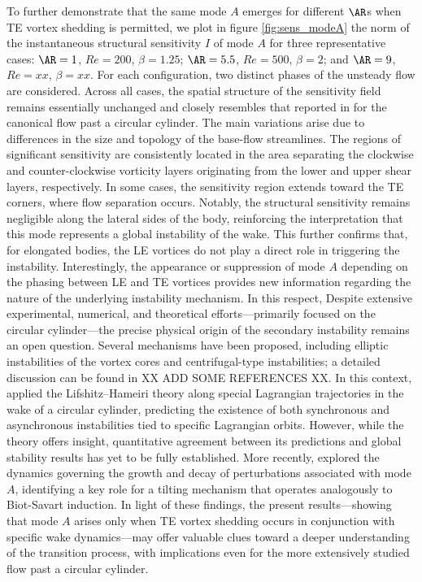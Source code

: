 %
To further demonstrate that the same mode $A$ emerges for different $\AR$s when TE vortex shedding is permitted, we plot in figure \ref{fig:sens_modeA} the norm of the instantaneous structural sensitivity $I$ of mode $A$ for three representative cases: $\AR=1$, $Re=200$, $\beta=1.25$; $\AR=5.5$, $Re=500$, $\beta=2$; and $\AR=9$, $Re=xx$, $\beta=xx$. For each configuration, two distinct phases of the unsteady flow are considered. Across all cases, the spatial structure of the sensitivity field remains essentially unchanged and closely resembles that reported in \cite{} for the canonical flow past a circular cylinder. The main variations arise due to differences in the size and topology of the base-flow streamlines.
%
The regions of significant sensitivity are consistently located in the area separating the clockwise and counter-clockwise vorticity layers originating from the lower and upper shear layers, respectively. In some cases, the sensitivity region extends toward the TE corners, where flow separation occurs. Notably, the structural sensitivity remains negligible along the lateral sides of the body, reinforcing the interpretation that this mode represents a global instability of the wake. This further confirms that, for elongated bodies, the LE vortices do not play a direct role in triggering the instability.
%
Interestingly, the appearance or suppression of mode $A$ depending on the phasing between LE and TE vortices provides new information regarding the nature of the underlying instability mechanism. In this respect, Despite extensive experimental, numerical, and theoretical efforts---primarily focused on the circular cylinder---the precise physical origin of the secondary instability remains an open question. Several mechanisms have been proposed, including elliptic instabilities of the vortex cores \citep{williamson-1996,leweke-williamson-1998} and centrifugal-type instabilities; a detailed discussion can be found in \cite{thompson-etal-2001} XX ADD SOME REFERENCES XX.
%
In this context, \cite{giannetti-2015} applied the Lifshitz–Hameiri theory along special Lagrangian trajectories in the wake of a circular cylinder, predicting the existence of both synchronous and asynchronous instabilities tied to specific Lagrangian orbits. However, while the theory offers insight, quantitative agreement between its predictions and global stability results has yet to be fully established. More recently, \cite{aleksyuk-heil-2023} explored the dynamics governing the growth and decay of perturbations associated with mode $A$, identifying a key role for a tilting mechanism that operates analogously to Biot-Savart induction.
%
In light of these findings, the present results---showing that mode $A$ arises only when TE vortex shedding occurs in conjunction with specific wake dynamics---may offer valuable clues toward a deeper understanding of the transition process, with implications even for the more extensively studied flow past a circular cylinder.

